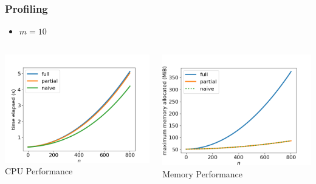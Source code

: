 \documentclass[11pt]{beamer}
\begin{document}
	\begin{frame}
		\frametitle{Profiling}
		\begin{itemize}
			\item $m=10$
		\end{itemize}
		\begin{columns}
			\begin{column}{0.5\textwidth}
				\begin{center}
					\includegraphics[width=\textwidth]{figures/cpu_profile.png}
					CPU Performance
				\end{center}
			\end{column}
			\begin{column}{0.5\textwidth}
				\begin{center}
					\includegraphics[width=\textwidth]{figures/memory_profile.png}
					Memory Performance
				\end{center}
			\end{column}
		\end{columns}
	\end{frame}
\end{document}
